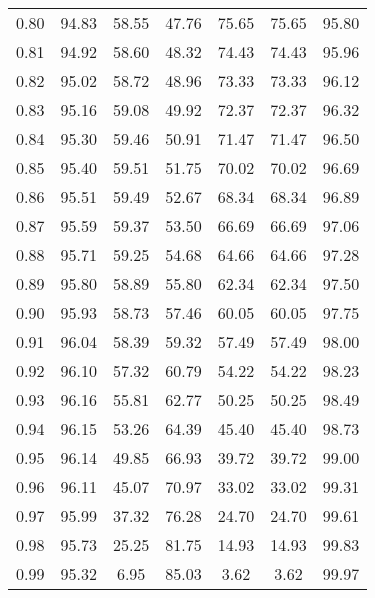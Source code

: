 \begin{tabular}{|c|c|c|c|c|c|c|}
      0.80 &     94.83 &     58.55 &      47.76 &   75.65 &      75.65 &         95.80 \\
      0.81 &     94.92 &     58.60 &      48.32 &   74.43 &      74.43 &         95.96 \\
      0.82 &     95.02 &     58.72 &      48.96 &   73.33 &      73.33 &         96.12 \\
      0.83 &     95.16 &     59.08 &      49.92 &   72.37 &      72.37 &         96.32 \\
      0.84 &     95.30 &     59.46 &      50.91 &   71.47 &      71.47 &         96.50 \\
      0.85 &     95.40 &     59.51 &      51.75 &   70.02 &      70.02 &         96.69 \\
      0.86 &     95.51 &     59.49 &      52.67 &   68.34 &      68.34 &         96.89 \\
      0.87 &     95.59 &     59.37 &      53.50 &   66.69 &      66.69 &         97.06 \\
      0.88 &     95.71 &     59.25 &      54.68 &   64.66 &      64.66 &         97.28 \\
      0.89 &     95.80 &     58.89 &      55.80 &   62.34 &      62.34 &         97.50 \\
      0.90 &     95.93 &     58.73 &      57.46 &   60.05 &      60.05 &         97.75 \\
      0.91 &     96.04 &     58.39 &      59.32 &   57.49 &      57.49 &         98.00 \\
      0.92 &     96.10 &     57.32 &      60.79 &   54.22 &      54.22 &         98.23 \\
      0.93 &     96.16 &     55.81 &      62.77 &   50.25 &      50.25 &         98.49 \\
      0.94 &     96.15 &     53.26 &      64.39 &   45.40 &      45.40 &         98.73 \\
      0.95 &     96.14 &     49.85 &      66.93 &   39.72 &      39.72 &         99.00 \\
      0.96 &     96.11 &     45.07 &      70.97 &   33.02 &      33.02 &         99.31 \\
      0.97 &     95.99 &     37.32 &      76.28 &   24.70 &      24.70 &         99.61 \\
      0.98 &     95.73 &     25.25 &      81.75 &   14.93 &      14.93 &         99.83 \\
      0.99 &     95.32 &      6.95 &      85.03 &    3.62 &       3.62 &         99.97 \\
\bottomrule
\end{tabular}
